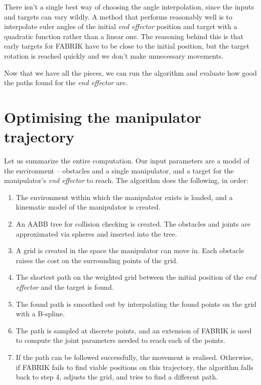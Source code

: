 There isn't a single best way of choosing the angle interpolation, since the inputs and targets can vary wildly. A method that performs reasonably well is to interpolate euler angles of the initial \textit{end effector} position and target with a quadratic function rather than a linear one. The reasoning behind this is that early targets for FABRIK have to be close to the initial position, but the target rotation is reached quickly and we don't make unnecessary movements.

Now that we have all the pieces, we can run the algorithm and evaluate how good the paths found for the \textit{end effector} are.

\section{Optimising the manipulator trajectory}

Let us summarize the entire computation. Our input parameters are a model of the environment -- obstacles and a single manipulator, and a target for the manipulator's \textit{end effector} to reach. The algorithm does the following, in order:

\begin{enumerate}
\item The environment within which the manipulator exists is loaded, and a kinematic model of the manipulator is created.
\item An AABB tree for collision checking is created. The obstacles and joints are approximated via spheres and inserted into the tree.
\item A grid is created in the space the manipulator can move in. Each obstacle raises the cost on the surrounding points of the grid.
\item The shortest path on the weighted grid between the initial position of the \textit{end effector} and the target is found.
\item The found path is smoothed out by interpolating the found points on the grid with a B-spline.
\item The path is sampled at discrete points, and an extension of FABRIK is used to compute the joint parameters needed to reach each of the points.
\item If the path can be followed successfully, the movement is realised. Otherwise, if FABRIK fails to find viable positions on this trajectory, the algorithm falls back to step 4, adjusts the grid, and tries to find a different path.
\end{enumerate}

